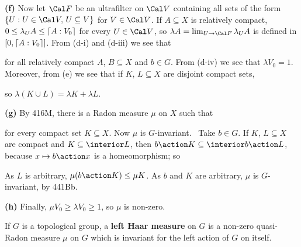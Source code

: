 {{\bf (f)} Now let $\Cal F$ be an ultrafilter on $\Cal V$ containing all
sets of the form $\{U:U\in\Cal V,\,U\subseteq V\}$ for $V\in\Cal V$.
If $A\subseteq X$ is relatively compact, $0\le\lambda_UA\le\lceil A:V_0\rceil$
for every $U\in\Cal V$, so $\lambda A=\lim_{U\to\Cal F}\lambda_UA$ is
defined in $[0,\lceil A:V_0\rceil]$.   From (d-i) and (d-iii) we see that


\noindent for all relatively compact $A$, $B\subseteq X$ and $b\in G$.
From (d-iv) we see that $\lambda V_0=1$.   Moreover, from (e) we see
that if $K$, $L\subseteq X$ are disjoint compact sets,


\noindent so $\lambda(K\cup L)=\lambda K+\lambda L$.

\medskip

{\bf (g)} By 416M, there is a Radon measure $\mu$ on $X$ such that


\noindent for every compact set $K\subseteq X$.   Now $\mu$ is
$G$-invariant.   \Prf\ Take $b\in G$.   If $K$, $L\subseteq X$ are
compact and $K\subseteq\interior L$, then
$b\action K\subseteq\interior b\action L$, because $x\mapsto b\action x$
is a homeomorphism;  so


\noindent As $L$ is arbitrary, $\mu(b\action K)\le\mu K$.   As $b$ and
$K$ are arbitrary, $\mu$ is $G$-invariant, by 441Bb.\ \Qed

\medskip

{\bf (h)} Finally, $\mu V_0\ge\lambda V_0\ge 1$, so $\mu$ is non-zero.
}%

 If $G$ is a topological group, a {\bf left
Haar measure} on $G$ is a non-zero quasi-Radon measure $\mu$ on $G$
which is invariant for the left action of $G$ on itself.

